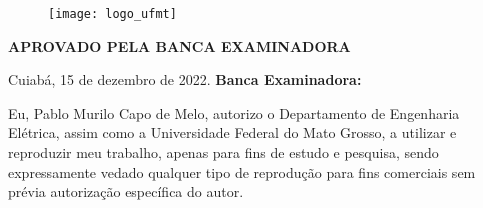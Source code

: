 \documentclass[12pt,oneside,a4paper,chapter=TITLE,section=TITLE,sumario=tradicional,english,brazil]{abntex2}
\makeatletter
\renewcommand{\imprimircapa}{
	\begin{capa}
		\begin{figure}[!h]
   			 \centering
   			 \texttt{[image: logo\_ufmt]}
 		 \end{figure}
		\center
		\imprimirinstituicao
	
		\vspace*{1cm}
	
		\imprimirautor
	
		\vfill
		\begin{center}
		\textbf{\imprimirtitulo}
		\end{center}
		\vfill
	
		\imprimirlocal
	
		\imprimirdata
	
		\vspace*{1cm}
	\end{capa}
}
\renewcommand{\imprimirfolhaderosto}{
	\begin{center}
		\imprimirautor
		\vspace*{\fill}\vspace*{\fill}
		\begin{center}
		\textbf{\imprimirtitulo}
		\end{center}
		\vspace*{\fill}
		
		\abntex@ifnotempty{\imprimirpreambulo}{
			\hspace{.45\textwidth}
			\begin{minipage}{.5\textwidth}
				\SingleSpacing
				\imprimirpreambulo
				\vspace*{1cm}
				\par
				\imprimirorientadorRotulo~
				\par				
				\imprimirorientador
			\end{minipage}
			\vspace*{\fill}
		}
		\vspace*{\fill}
		{\imprimirlocal}
		\par
		{\imprimirdata}
	\end{center}
}
\makeatother
\begin{document}
\frenchspacing 
{}
 
\imprimircapa
\imprimirfolhaderosto
\newpage

\begin{folhadeaprovacao}
 \begin{center}
    \imprimirautor

    \vspace*{\fill}\vspace*{\fill}
    \begin{center}
      \textbf{\imprimirtitulo}
    \end{center}
    \vspace*{\fill}
    
    \hspace{.45\textwidth}
    \begin{minipage}{.5\textwidth}
        \imprimirpreambulo
    \end{minipage}%
    \vspace*{\fill}
   \end{center}
   
   \begin{center}
   \textbf{APROVADO PELA BANCA EXAMINADORA}
   \par
   Cuiabá, 15 de dezembro de 2022.
   \vfill
   \textbf{Banca Examinadora:}
   \end{center}
      
   \begin{center}
    \vspace*{0.5cm}
    {\imprimirlocal}
    \par
    {\imprimirdata}
    \vspace*{1cm}
  \end{center}
  
\end{folhadeaprovacao}

\noindent
	{Eu, Pablo Murilo Capo de Melo, autorizo o Departamento de Engenharia Elétrica, assim como a Universidade Federal do Mato Grosso, a utilizar e reproduzir meu trabalho, apenas para fins de estudo e pesquisa, sendo expressamente vedado qualquer tipo de reprodução para fins comerciais sem prévia autorização específica do autor.}
	
\end{document}
